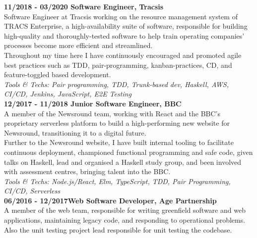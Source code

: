 \textbf{11/2018 - 03/2020 \hspace{2.75em}Software Engineer, Tracsis}\\

Software Engineer at Tracsis working on the resource management system of TRACS Enterprise, a high-availability suite of software, responsible for building high-quality and thoroughly-tested software to help train operating companies' processes become more efficient and streamlined.\\

Throughout my time here I have continuously encouraged and promoted agile best practices such as TDD, pair-programming, kanban-practices, CD, and feature-toggled based development.\\

\emph{Tools \& Techs: Pair programming, TDD, Trunk-based dev, Haskell, AWS, CI/CD, Jenkins, JavaScript, E2E Testing}\\

\textbf{12/2017 - 11/2018 \hspace{2.75em}Junior Software Engineer, BBC}\\

A member of the Newsround team, working with React and the BBC's proprietary serverless platform to build a high-performing new website for Newsround, transitioning it to a digital future.\\

Further to the Newsround website, I have built internal tooling to facilitate continuous deployment, championed functional programming and safe code, given talks on Haskell, lead and organised a Haskell study group, and been involved with assessment centres, bringing talent into the BBC.\\

\emph{Tools \& Techs: Node.js/React, Elm, TypeScript, TDD, Pair Programming, CI/CD, Serverless}\\

\textbf{06/2016 - 12/2017\hspace{2.75em}Web Software Developer, Age Partnership}\\

A member of the web team, responsible for writing greenfield software and web applications, maintaining legacy code, and responding to operational problems. Also the unit testing project lead responsible for unit testing the codebase.

